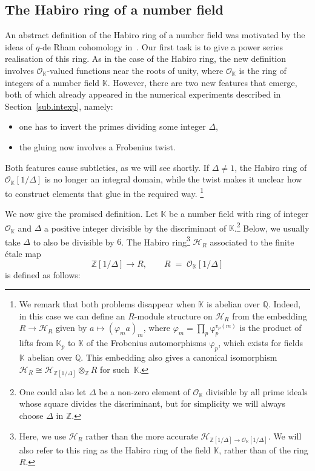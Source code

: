 \documentclass[12pt,reqno]{amsart}
\theoremstyle{definition}
\def\BZ{\mathbb Z}
\def\BQ{\mathbb Q}
\def\BK{\mathbb K}
\def\calH{\mathcal H}
\def\be{\begin{equation}}
\def\ee{\end{equation}}
\def\calO{\mathcal{O}}
\def\={\;=\;}
\def\fr{\mathrm{\varphi}_p}
\begin{document}
\subsection{The Habiro ring of a number field}
\label{sub.hab}

An abstract definition of the Habiro ring of a number field was motivated by
the ideas of $q$-de Rham cohomology in~\cite{Scholze:canonical}. Our first task
is to give a power series realisation of this ring.
As in the case of the Habiro ring, the new definition involves $\calO_{\BK}$-valued
functions near the roots of unity, where $\calO_{\BK}$ is the ring of integers of a
number field $\BK$. However, there are two new features that emerge,
both of which already appeared in the numerical experiments described in
Section~\ref{sub.intexp}, namely:
\begin{itemize}
\item
  one has to invert the primes dividing some integer $\Delta$,
\item
  the gluing now involves a Frobenius twist.
\end{itemize}

Both features cause subtleties, as we will see shortly. If $\Delta \neq 1$,
the Habiro ring of $\calO_\BK[1/\Delta]$ is no longer an integral domain, while the
twist makes it
unclear how to construct elements that glue in the required way.
\footnote{We remark that both problems disappear when $\BK$ is abelian over $\BQ$.
Indeed, in this case we can define an $R$-module
structure on $\calH_R$ from the embedding $R\to\calH_R$ given by
$a\mapsto(\varphi_{m}a)_m$,
where $\varphi_m=\prod_p\fr^{v_p(m)}$ is the product of lifts from $\BK_p$ to $\BK$
of the Frobenius automorphisms $\fr$\thinspace,
which exists for fields $\BK$ abelian over $\BQ$.
This embedding also gives a canonical isomorphism
$\calH_R\cong\calH_{\BZ[1/\Delta]}\otimes_{\BZ} R$ for such~$\BK$.}

We now give the promised definition. Let $\BK$ be a number field with ring of integer
$\calO_{\BK}$ and $\Delta$ a positive integer divisible by the discriminant of
$\BK$.\footnote{One could also let $\Delta$ be a non-zero element of $\calO_{\BK}$
  divisible by all prime ideals whose square divides the discriminant, but for
  simplicity we will always choose $\Delta$ in $\BZ$.}
Below, we usually take $\Delta$ to also be divisible by $6$.
The Habiro ring\footnote{ 
Here, we use $\calH_{R}$ rather than the more accurate
$\calH_{\BZ[1/\Delta] \to \calO_{\BK}[1/\Delta]}$. We will also refer to this ring
as the Habiro ring of the field $\BK$, rather than of the ring $R$.} $\calH_{R}$
associated to the finite \'etale map
\be
\label{Fetale}
\BZ[1/\Delta] \to R, \qquad R \= \calO_{\BK}[1/\Delta]
\ee
is defined as follows:
\end{document}
